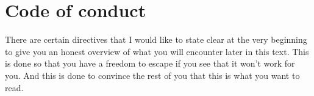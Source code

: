 \documentclass[10pt]{report}
\begin{document}
{\fontsize{12}{12}}

\vspace*{1cm}

{\fontsize{12}{12}}

\vspace*{0.5cm}

{\fontsize{12}{12}}

\vspace*{0.5cm}

{\fontsize{12}{12}}

\vspace*{0.5cm}

{\fontsize{12}{12}}

\vspace*{2cm}


\newpage

\chapter*{Code of conduct}
\thispagestyle{empty}
There are certain directives that I would like to state clear at the very beginning to give you an honest overview of what you will encounter later in this text. This is done so that you have a freedom to escape if you see that it won't work for you. And this is done to convince the rest of you that this is what you want to read.
\end{document}

